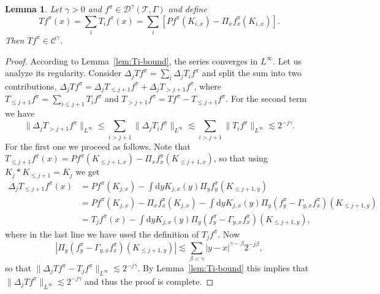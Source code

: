 \documentclass[a4paper,11pt]{article}
\newcommand{\mathd}{\mathrm{d}}
\newtheorem{lemma}[theorem]{Lemma}
\theoremstyle{remark}
\newcommand{\CC}{\ensuremath{\mathscr{C}}}
\begin{document}
\begin{lemma}\label{lem:T-hoelder}
  Let $\gamma >0$ and $f^\pi \in \mathcal{D}^{\gamma} ( \mathcal{T}, \Gamma )$ and define
  \[
     T f^{\pi} ( x ) = \sum_{i} T_{i} f^{\pi} ( x ) = \sum_{i} [P f^{\pi} ( K_{i,x} ) -  \Pi_{x} f^{\pi}_{x} ( K_{i,x} )].
  \]
  Then $T f^{\pi} \in \CC^{\gamma}$.
\end{lemma}

\begin{proof}
  According to Lemma~\ref{lem:Ti-bound}, the series converges in $L^\infty$. Let us analyze its regularity. Consider $\Delta_{j} T f^{\pi} =
  \sum_{i} \Delta_{j} T_{i} f^{\pi}$ and split the sum into two contributions,
  $\Delta_{j} T f^{\pi} = \Delta_{j} T_{\leqslant j+1}  f^{\pi} + \Delta_{j}
  T_{>j+1}  f^{\pi}$, where $T_{\leqslant j+1}  f^{\pi} = \sum_{i \leqslant
  j+1} T_{i}  f^{\pi}$ and $T_{>j+1}  f^{\pi} =T f^{\pi}  -T_{\leqslant j+1}
  f^{\pi}$. For the second term we have
  \[ \| \Delta_{j} T_{>j+1}  f^{\pi} \|_{L^{\infty}} \leqslant \sum_{i>j+1} \|
     \Delta_{j} T_{i} f^{\pi} \|_{L^{\infty}} \lesssim \sum_{i>j+1} \| T_{i}
     f^{\pi} \|_{L^{\infty}} \lesssim 2^{-j \gamma} . \]
  For the first one we proceed as follows. Note that $T_{\leqslant j+1}
  f^{\pi} ( x ) = P f^{\pi} (K_{\leqslant j+1,x} ) - \Pi_{x} f^{\pi}_{x} ( K_{\leqslant j+1,x} )$, so that using $K_{j} \ast K_{\leqslant
  j+1} =K_{j}$ we get
  \begin{align*}
     \Delta_{j} T_{\leqslant j+1}  f^{\pi}(x) & = P f^{\pi} ( K_{j,x} ) - \int \mathd y K_{j,x} ( y ) \Pi_{y} f^{\pi}_{y} ( K_{\leqslant j+1,y} ) \\
     & = P f^{\pi} ( K_{j,x} )  - \Pi_{x} f^{\pi}_{x} ( K_{j,x} ) - \int \mathd y K_{j,x} ( y ) \Pi_{y} ( f^{\pi}_{y} - \Gamma_{y,x} f^{\pi}_{x} ) ( K_{\leqslant j+1,y} ) \\
     & =T_{j} f^{\pi} ( x ) - \int \mathd y K_{j,x} ( y ) \Pi_{y} ( f^{\pi}_{y} - \Gamma_{y,x} f^{\pi}_{x} ) ( K_{\leqslant j+1,y} ),
  \end{align*}
  where in the last line we have used the definition of $T_{j} f^{\pi}$. Now
  \[
     | \Pi_{y} ( f^{\pi}_{y} - \Gamma_{y,x} f^{\pi}_{x} ) ( K_{\leqslant j+1,y} ) | \lesssim \sum_{\beta < \gamma} | y-x |^{\gamma - \beta} 2^{-j \beta},
  \]
  so that $\| \Delta_{j} T f^{\pi} -T_{j} f^{\pi} \|_{L^{\infty}} \lesssim 2^{-j
  \gamma}$. By Lemma~\ref{lem:Ti-bound} this implies that $\| \Delta_{j} T f^{\pi} \|_{L^{\infty}}
  \lesssim 2^{-j \gamma}$ and thus the proof is complete.
\end{proof}
\end{document}
